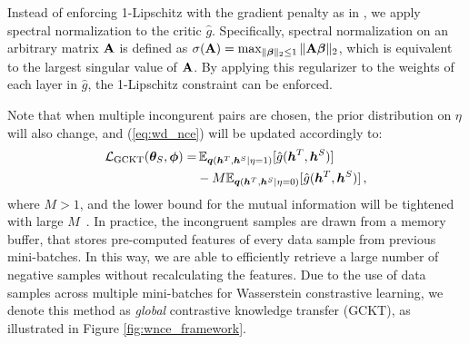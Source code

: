 \documentclass[final]{cvpr}
\newcommand{\Amat}{{\bf A}}
\newcommand{\hv}{{\boldsymbol h}}
\newcommand{\qv}{{\boldsymbol q}}
\newcommand{\betav}{{\boldsymbol \beta}}
\newcommand{\thetav}{{\boldsymbol \theta}}
\newcommand{\phiv}{{\boldsymbol \phi}}
\newcommand{\Lcal}{\mathcal{L}}
\theoremstyle{definition}
\newcommand{\Ep}{{\mathbb E}}
\begin{document}
Instead of enforcing 1-Lipschitz with the gradient penalty as in \cite{gulrajani2017improved}, we apply spectral normalization \cite{miyato2018spectral} to the critic $\hat{g}$. Specifically,
spectral normalization on an arbitrary matrix $\Amat$ is defined as $\sigma(\Amat)=\max_{\|\betav\|_2\leq 1} \|\Amat\betav\|_2$, which is equivalent to the largest singular value of $\Amat$. 
By applying this regularizer to the weights of each layer in $\hat{g}$, the 1-Lipschitz constraint can be enforced.


Note that when multiple incongurent pairs are chosen, the prior distribution on $\eta$ will also change, and (\ref{eq:wd_nce}) will be updated accordingly to:
\begin{align}
\footnotesize
\label{eq:wnce}
    \Lcal_{\mathrm{GCKT}} (\thetav_S, \phiv) =& \, \Ep_{\qv(\hv^T, \hv^S|\eta=1)}[ \hat{g}(\hv^T, \hv^S)] \\
    &- M  \Ep_{\qv(\hv^T, \hv^S|\eta=0)}[ \hat{g}(\hv^T, \hv^S)] \,, \nonumber
\end{align}
where $M>1$, and the lower bound for the mutual information will be tightened with large $M$~\cite{gutmann2010noise, tian2019contrastive}.
In practice, the incongruent samples are drawn from a memory buffer, that stores pre-computed features of every data sample from previous mini-batches. In this way, we are able to efficiently retrieve a large number of negative samples without recalculating the features. 
Due to the use of data samples across multiple mini-batches for Wasserstein constrastive learning, we denote this method as \emph{global} contrastive knowledge transfer (GCKT), as illustrated in Figure \ref{fig:wnce_framework}.
\end{document}
